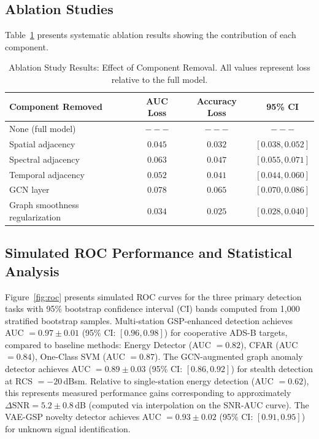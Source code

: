 \documentclass[sensors,article,submit,pdftex]{mdpi}
\begin{document}
\subsection{Ablation Studies}
\label{sec:ablation}

Table~\ref{tab:ablation} presents systematic ablation results showing the contribution of each component.

\begin{table}[H]
    \centering
    \caption{Ablation Study Results: Effect of Component Removal. All values represent loss relative to the full model.}
    \label{tab:ablation}
    \small
    \begin{tabular}{@{}lccc@{}}
        \toprule
        \textbf{Component Removed} & \textbf{AUC Loss} & \textbf{Accuracy Loss} & \textbf{95\% CI} \\
        \midrule
        None (full model) & $---$ & $---$ & $---$ \\
        Spatial adjacency & $0.045$ & $0.032$ & $[0.038, 0.052]$ \\
        Spectral adjacency & $0.063$ & $0.047$ & $[0.055, 0.071]$ \\
        Temporal adjacency & $0.052$ & $0.041$ & $[0.044, 0.060]$ \\
        GCN layer & $0.078$ & $0.065$ & $[0.070, 0.086]$ \\
        Graph smoothness regularization & $0.034$ & $0.025$ & $[0.028, 0.040]$ \\
        \bottomrule
    \end{tabular}
\end{table}

\subsection{Simulated ROC Performance and Statistical Analysis}
\label{sec:roc_analysis}

Figure~\ref{fig:roc} presents simulated ROC curves for the three primary detection tasks with 95\% bootstrap confidence interval (CI) bands computed from 1,000 stratified bootstrap samples. Multi-station GSP-enhanced detection achieves AUC $= 0.97 \pm 0.01$ (95\% CI: $[0.96, 0.98]$) for cooperative ADS-B targets, compared to baseline methods: Energy Detector (AUC $= 0.82$), CFAR (AUC $= 0.84$), One-Class SVM (AUC $= 0.87$). The GCN-augmented graph anomaly detector achieves AUC $= 0.89 \pm 0.03$ (95\% CI: $[0.86, 0.92]$) for stealth detection at RCS $= -20$\,dBsm. Relative to single-station energy detection (AUC $= 0.62$), this represents measured performance gains corresponding to approximately $\Delta \text{SNR} = 5.2 \pm 0.8$\,dB (computed via interpolation on the SNR-AUC curve). The VAE-GSP novelty detector achieves AUC $= 0.93 \pm 0.02$ (95\% CI: $[0.91, 0.95]$) for unknown signal identification.
\end{document}
